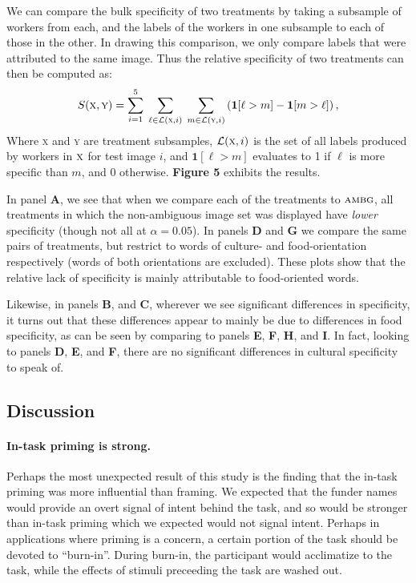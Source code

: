 \documentclass[a4paper]{report}
\begin{document}
We can compare the bulk specificity of two treatments by taking a subsample
of workers from each, and the labels of the workers in one
subsample to each of those in the other.  In drawing this comparison, we only 
compare labels that were attributed to the same image.  Thus the relative 
specificity of two treatments can then be computed as:
\begin{align}
	S(\textsc{x},\textsc{y}) = 
		\sum_{i=1}^5 \; 
		\sum_{\ell\in \mathcal{L}(\textsc{x},i)} \;
		\sum_{m\in \mathcal{L}
		(\textsc{y},i)} \left(\mathbf{1}[\ell > m] 
		- \mathbf{1}[m>\ell]\right),
\end{align}
Where \textsc{x} and \textsc{y} are treatment subsamples,
$\mathcal{L}(\textsc{x},i)$ is the set of all labels produced by workers in 
$\textsc{x}$ for test image $i$, and $\mathbf{1}[\ell > m]$ evaluates to 1 if 
$\ell$ is more specific than $m$, and 0 otherwise.  \textbf{Figure 5} 
exhibits the results.

In panel \textbf{A}, we see that when we compare each of the treatments to
$\textsc{ambg}$, all treatments in which the non-ambiguous image set was 
displayed have \textit{lower} specificity (though not all at $\alpha=0.05$).  
In panels \textbf{D} and \textbf{G} we compare the same pairs of treatments, 
but restrict to words of culture- and food-orientation respectively (words
of both orientations are excluded).  These plots show that the relative lack of specificity is mainly attributable to food-oriented words.  

Likewise, in panels \textbf{B}, and \textbf{C}, 
wherever we see significant differences in specificity, it turns out that
these differences appear to mainly be due to differences in food specificity,
as can be seen by comparing to panels \textbf{E}, \textbf{F}, \textbf{H}, and 
\textbf{I}.  In fact, looking to panels \textbf{D}, \textbf{E}, and \textbf{F},
there are no significant differences in cultural specificity to speak of. 

\subsection*{Discussion}

\paragraph{In-task priming is strong.}  Perhaps the most unexpected result of 
this study is the finding that the in-task priming was more influential than
framing.  We expected that the funder names would provide an overt signal of 
intent behind the task, and so would be stronger than in-task priming which 
we expected would not signal intent.  Perhaps in applications where priming 
is a concern, a certain portion of the task should be devoted to  
``burn-in''.  During burn-in, the participant would acclimatize to the task, 
while the effects of stimuli preceeding the task are washed out.
\end{document}
